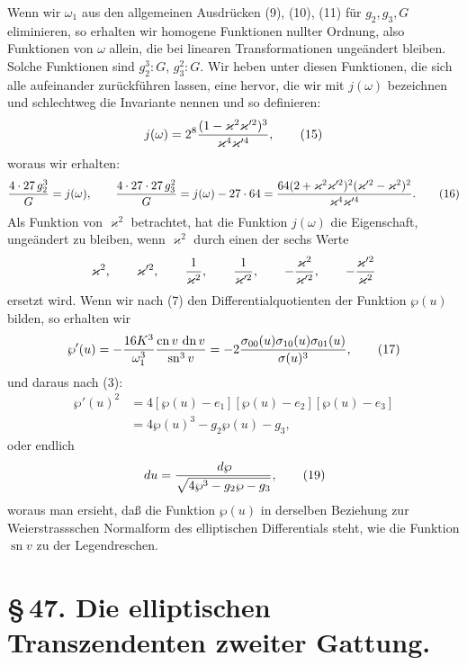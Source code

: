 \documentclass[11pt]{article}
\providecommand{\dd}{\,d}
\providecommand{\sn}{\operatorname{sn}}
\providecommand{\cn}{\operatorname{cn}}
\providecommand{\dn}{\operatorname{dn}}
\begin{document}
Wenn wir $\omega_1$ aus den allgemeinen Ausdrücken (9), (10), (11) für $g_2,g_3,G$ eliminieren, so erhalten wir homogene Funktionen nullter Ordnung, also Funktionen von $\omega$ allein, die bei linearen Transformationen ungeändert bleiben. Solche Funktionen sind $g_2^3:G$, $g_3^2:G$. Wir heben unter diesen Funktionen, die sich alle aufeinander zurückführen lassen, eine hervor, die wir mit $j(\omega)$ bezeichnen und schlechtweg die Invariante nennen und so definieren:
\begin{equation}
j(\omega)=2^8{(1-\varkappa^2\varkappa'^2)^3\over\varkappa^4\varkappa'^4},
\tag{15}
\end{equation}
woraus wir erhalten:
\begin{equation}
{4\cdot27\,g_2^3\over G}=j(\omega),
\qquad
{4\cdot27\cdot27\,g_3^2\over G}=j(\omega)-27\cdot64
={64(2+\varkappa^2\varkappa'^2)^2(\varkappa'^2-\varkappa^2)^2\over\varkappa^4\varkappa'^4}.
\tag{16}
\end{equation}
Als Funktion von $\varkappa^2$ betrachtet, hat die Funktion $j(\omega)$ die Eigenschaft, ungeändert zu bleiben, wenn $\varkappa^2$ durch einen der sechs Werte
\[
\varkappa^2,
\qquad \varkappa'^2,
\qquad {1\over\varkappa^2},
\qquad {1\over\varkappa'^2},
\qquad -{\varkappa^2\over\varkappa'^2},
\qquad -{\varkappa'^2\over\varkappa^2}
\]
ersetzt wird.
Wenn wir nach (7) den Differentialquotienten der Funktion $\wp(u)$ bilden, so erhalten wir
\begin{equation}
\wp'(u)=-{16K^3\over\omega_1^3}{\cn v\,\dn v\over\sn^3v}
=-2{\sigma_{00}(u)\sigma_{10}(u)\sigma_{01}(u)\over\sigma(u)^3},
\tag{17}
\end{equation}
und daraus nach (3):
\begin{equation}
\begin{aligned}
\wp'(u)^2&=4[\wp(u)-e_1][\wp(u)-e_2][\wp(u)-e_3]\\
&=4\wp(u)^3-g_2\wp(u)-g_3,
\end{aligned}
\tag{18}
\end{equation}
oder endlich
\begin{equation}
\dd u={\dd\wp\over\sqrt{4\wp^3-g_2\wp-g_3}},
\tag{19}
\end{equation}
woraus man ersieht, daß die Funktion $\wp(u)$ in derselben Beziehung zur Weierstrassschen Normalform des elliptischen Differentials steht, wie die Funktion $\sn v$ zu der Legendreschen.

\section*{\S\,47. Die elliptischen Transzendenten zweiter Gattung.}
\end{document}
